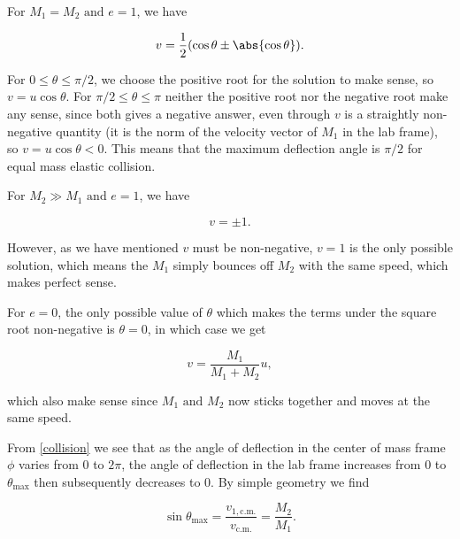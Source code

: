 \documentclass[a4paper,12pt]{report}
\begin{document}
{For \(M_1 =M_2 \text { and } e = 1\), we have 

\begin{equation}
	v = \frac{1}{2} (\cos \theta \pm \abs{\cos \theta } ).
\end{equation}

For \(0 \le  \theta \le  \pi /2\), we choose the positive root for the solution to make sense, so \(v = u \cos \theta \). For \(\pi /2 \le  \theta \le  \pi \) neither the positive root nor the negative root make any sense, since both gives a negative answer, even through \(v\) is a straightly non-negative quantity (it is the norm of the velocity vector of \(M_1 \) in the lab frame), so \(v = u\cos \theta < 0\). This means that the maximum deflection angle is \(\pi /2\) for equal mass elastic collision. 

For \(M_2 \gg M_1 \text { and } e =1\), we have 

\begin{equation}
	v = \pm 1.
\end{equation}

However, as we have mentioned \(v\) must be non-negative, \(v = 1\) is the only possible solution, which means the \(M_1 \) simply bounces off \(M_2 \) with the same speed, which makes perfect sense.

For \(e = 0\), the only possible value of \(\theta \) which makes the terms under the square root non-negative is \(\theta  = 0\), in which case we get 

\begin{equation}
	v = \frac{M_1 }{M_1 + M_2 } u, 
\end{equation}

which also make sense since \(M_1 \text { and } M_2 \) now sticks together and moves at the same speed. 

From \cref{collision} we see that as the angle of deflection in the center of mass frame \(\phi \) varies from \(0 \) to \(2\pi \), the angle of deflection in the lab frame increases from \(0\) to \(\theta _{\text{max} } \) then subsequently decreases to \(0\). By simple geometry we find 

\begin{equation}
	\sin \theta _{\text{max} } = \frac{v_{1,\text{c.m.} } }{v_{\text{c.m.} } }  = \frac{M_2 }{M_1 }.  
\end{equation}
~
} 

\end{document}
